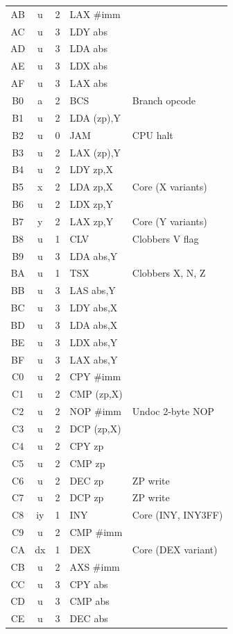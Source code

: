 \documentclass{article}
\begin{document}
{\begin{longtable}{@{}ccclp{4.8cm}@{}}
AB & u  & 2 & LAX \#imm & \\
AC & u  & 3 & LDY abs & \\
AD & u  & 3 & LDA abs & \\
AE & u  & 3 & LDX abs & \\
AF & u  & 3 & LAX abs & \\
B0 & a  & 2 & BCS & Branch opcode \\
B1 & u  & 2 & LDA (zp),Y & \\
B2 & u  & 0 & JAM & CPU halt \\
B3 & u  & 2 & LAX (zp),Y & \\
B4 & u  & 2 & LDY zp,X & \\
B5 & x  & 2 & LDA zp,X & Core (X variants) \\
B6 & u  & 2 & LDX zp,Y & \\
B7 & y  & 2 & LAX zp,Y & Core (Y variants) \\
B8 & u  & 1 & CLV & Clobbers V flag \\
B9 & u  & 3 & LDA abs,Y & \\
BA & u  & 1 & TSX & Clobbers X, N, Z \\
BB & u  & 3 & LAS abs,Y & \\
BC & u  & 3 & LDY abs,X & \\
BD & u  & 3 & LDA abs,X & \\
BE & u  & 3 & LDX abs,Y & \\
BF & u  & 3 & LAX abs,Y & \\
C0 & u  & 2 & CPY \#imm & \\
C1 & u  & 2 & CMP (zp,X) & \\
C2 & u  & 2 & NOP \#imm & Undoc 2-byte NOP \\
C3 & u  & 2 & DCP (zp,X) & \\
C4 & u  & 2 & CPY zp & \\
C5 & u  & 2 & CMP zp & \\
C6 & u  & 2 & DEC zp & ZP write \\
C7 & u  & 2 & DCP zp & ZP write \\
C8 & iy & 1 & INY & Core (INY, INY3FF) \\
C9 & u  & 2 & CMP \#imm & \\
CA & dx & 1 & DEX & Core (DEX variant) \\
CB & u  & 2 & AXS \#imm & \\
CC & u  & 3 & CPY abs & \\
CD & u  & 3 & CMP abs & \\
CE & u  & 3 & DEC abs & \\

\end{longtable}}
\end{document}
